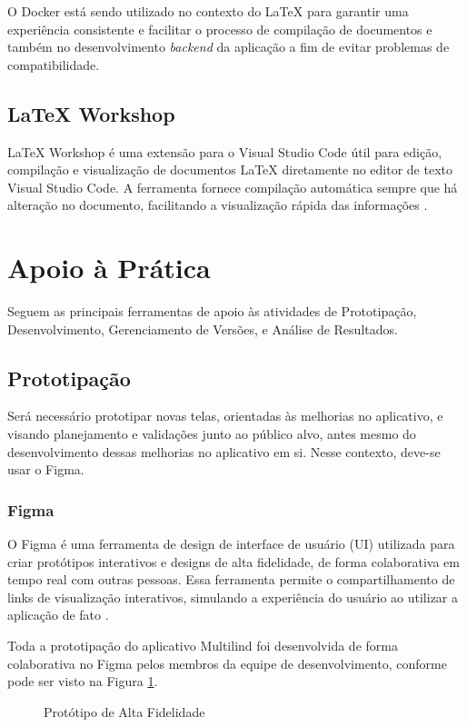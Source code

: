O Docker está sendo utilizado no contexto do LaTeX para garantir uma experiência consistente e facilitar o 
processo de compilação de documentos e também no desenvolvimento \textit{backend} da aplicação a fim de evitar problemas 
de compatibilidade.

\subsection{LaTeX Workshop}
\label{sec:LaTeX Workshop}
LaTeX Workshop é uma extensão para o Visual Studio Code útil para edição, compilação e visualização de 
documentos LaTeX diretamente no editor de texto Visual Studio Code. A ferramenta fornece compilação 
automática sempre que há alteração no documento, facilitando a visualização rápida das informações \cite{latexworkshop}.

\section{Apoio à Prática}
\label{sec:Apoio à Prática}
Seguem as principais ferramentas de apoio às atividades de Prototipação, Desenvolvimento, Gerenciamento de Versões, 
e Análise de Resultados.

\subsection{Prototipação}
\label{sec:Prototipação}
Será necessário prototipar novas telas, orientadas às melhorias no aplicativo, e visando planejamento e validações 
junto ao público alvo, antes mesmo do desenvolvimento dessas melhorias no aplicativo em si. Nesse contexto, deve-se 
usar o Figma.

\subsubsection{Figma}
\label{sec:Figma}
O Figma é uma ferramenta de design de interface de usuário (UI) utilizada para criar protótipos interativos e designs de alta fidelidade, de forma  
colaborativa em tempo real com outras pessoas. Essa ferramenta permite o compartilhamento de links de visualização interativos, simulando a experiência 
do usuário ao utilizar a aplicação de fato \cite{figma}.

Toda a prototipação do aplicativo Multilind foi desenvolvida de forma colaborativa no Figma pelos membros da equipe de desenvolvimento, conforme pode ser visto 
na Figura \ref{fig03}.

\begin{figure}[h!]
	\centering
	\caption{Protótipo de Alta Fidelidade}
	\label{fig03}
\end{figure}

